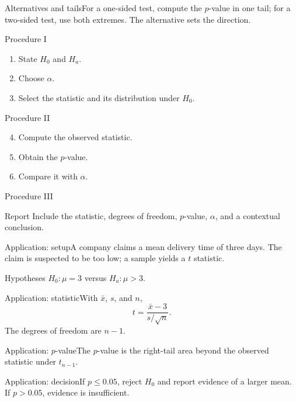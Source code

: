 \documentclass[10pt,aspectratio=169]{beamer}
\begin{document}
\begin{frame}{Alternatives and tails}\small For a one-sided test, compute the $p$-value in one tail; for a two-sided test, use both extremes. The alternative sets the direction.\end{frame}
\begin{frame}{Procedure I}\small\begin{enumerate}\item State $H_0$ and $H_a$.\item Choose $\alpha$.\item Select the statistic and its distribution under $H_0$.\end{enumerate}\end{frame}
\begin{frame}{Procedure II}\small\begin{enumerate}\setcounter{enumi}{3}\item Compute the observed statistic.\item Obtain the $p$-value.\item Compare it with $\alpha$.\end{enumerate}\end{frame}
\begin{frame}{Procedure III}\small\begin{block}{Report} Include the statistic, degrees of freedom, $p$-value, $\alpha$, and a contextual conclusion.\end{block}\end{frame}
\begin{frame}{Application: setup}\small A company claims a mean delivery time of three days. The claim is suspected to be too low; a sample yields a $t$ statistic.\begin{block}{Hypotheses} $H_0:\mu=3$ versus $H_a:\mu>3$.\end{block}\end{frame}
\begin{frame}{Application: statistic}\small With $\bar x$, $s$, and $n$,\[t=\frac{\bar x-3}{s/\sqrt n}.\]The degrees of freedom are $n-1$.\end{frame}
\begin{frame}{Application: $p$-value}\small The $p$-value is the right-tail area beyond the observed statistic under $t_{n-1}$.\end{frame}
\begin{frame}{Application: decision}\small If $p\leq0.05$, reject $H_0$ and report evidence of a larger mean. If $p>0.05$, evidence is insufficient.\end{frame}
\end{document}
